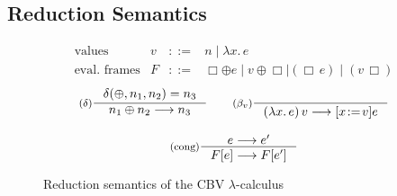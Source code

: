 \documentclass{tufte-handout}
\newcommand{\LAM}[1]{\lambda #1.\,}
\newcommand{\APP}[0]{\,}
\newcommand{\by}[0]{\!:=\!}
\newcommand{\ext}[3]{#3(#1{\mapsto}#2)}
\begin{document}


\subsection{Reduction Semantics}


\begin{figure}[tbp]
\[
\begin{array}{lccl}
  \text{values} & v &::=& n \mid \LAM{x}e \\
  \text{eval. frames} & F &::=& \Box \oplus e \mid v \oplus \Box \mid (\Box \APP e) 
     \mid (v \APP \Box)
\end{array}
\]
\begin{gather*}
  \inference[($\delta$)]{\delta(\oplus,n_1,n_2) = n_3}
            {n_1 \oplus n_2 \longrightarrow n_3} 
  \qquad
  \inference[($\beta_v$)]{}
            {(\LAM{x}e)\APP v \longrightarrow [x\by v]e} \\[2ex]
  \inference[(cong)]{e \longrightarrow e'}
                    {F[e] \longrightarrow F[e']}
\end{gather*}

\caption{Reduction semantics of the CBV $\lambda$-calculus}
\label{fig:lambda-reduce}
\end{figure}
\end{document}
